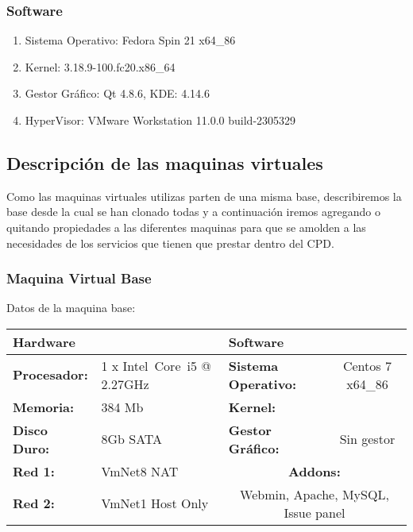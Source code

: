 \subsubsection{Software}
\begin{enumerate}
	\setlength\itemsep{1px} %
	\item Sistema Operativo: Fedora Spin 21 x64\_86
	\item Kernel: 3.18.9-100.fc20.x86\_64
	\item Gestor Gráfico: Qt 4.8.6, KDE: 4.14.6
	\item HyperVisor: VMware Workstation 11.0.0 build-2305329
\end{enumerate}

\subsection{Descripción de las maquinas virtuales}
Como las maquinas virtuales utilizas parten de una misma base, describiremos la base desde la cual se han clonado todas y a continuación iremos agregando o quitando propiedades a las diferentes maquinas para que se amolden a las necesidades de los servicios que tienen que prestar dentro del CPD.\\

\subsubsection{Maquina Virtual Base}
Datos de la maquina base:\\
\begin{tabular}{|l|l|l|c|}
	\hline \multicolumn{2}{|l|}{\textbf{Hardware}} & \multicolumn{2}{l|}{\textbf{Software}} \\ 
	\hline \textbf{Procesador:} & 1 x Intel\textregistered~Core\texttrademark~i5 @ 2.27GHz & \textbf{Sistema Operativo:} & Centos 7 x64\_86 \\ 
	\hline \textbf{Memoria:} & 384 Mb & \textbf{Kernel:} &  \\ 
	\hline \textbf{Disco Duro:} & 8Gb SATA & \textbf{Gestor Gráfico:} & Sin gestor \\ 
	\hline \textbf{Red 1:} & VmNet8 NAT  & \multicolumn{2}{c|}{\textbf{Addons:}} \\ 
	\hline \textbf{Red 2:} & VmNet1 Host Only & \multicolumn{2}{c|}{Webmin, Apache, MySQL, Issue panel} \\ 
	\hline 
\end{tabular} 


